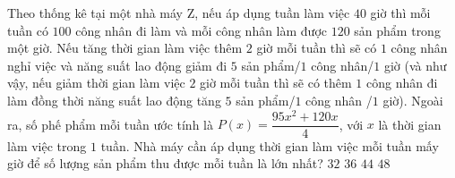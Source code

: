 \begin{ex}%
	Theo thống kê tại một nhà máy Z, nếu áp dụng tuần làm việc $40$ giờ thì mỗi tuần có $100$ công nhân đi làm và mỗi công nhân làm được $120$ sản phẩm trong một giờ. Nếu tăng thời gian làm việc thêm $2$ giờ mỗi tuần thì sẽ có $1$ công nhân nghỉ việc và năng suất lao động giảm đi $5$ sản phẩm/$1$ công nhân/$1$ giờ (và như vậy, nếu giảm thời gian làm việc $2$ giờ mỗi tuần thì sẽ có thêm $1$ công nhân đi làm đồng thời năng suất lao động tăng $5$ sản phẩm/$1$ công nhân /$1$ giờ). Ngoài ra, số phế phẩm mỗi tuần ước tính là $P(x) = \dfrac{95x^2+120x}{4}$, với $x$ là thời gian làm việc trong $1$ tuần. Nhà máy cần áp dụng thời gian làm việc mỗi tuần mấy giờ để số lượng sản phẩm thu được mỗi tuần là lớn nhất?
	\choice
	{$32$}
	{\True $36$}
	{$44$}
	{$48$}
\end{ex}

